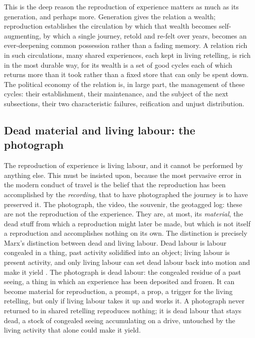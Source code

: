 This is the deep reason the reproduction of experience matters as much as its generation, and perhaps more. Generation gives the relation a wealth; reproduction establishes the circulation by which that wealth becomes self-augmenting, by which a single journey, retold and re-felt over years, becomes an ever-deepening common possession rather than a fading memory. A relation rich in such circulations, many shared experiences, each kept in living retelling, is rich in the most durable way, for its wealth is a set of good cycles each of which returns more than it took rather than a fixed store that can only be spent down. The political economy of the relation is, in large part, the management of these cycles: their establishment, their maintenance, and the subject of the next subsections, their two characteristic failures, reification and unjust distribution.

\subsection{Dead material and living labour: the photograph}
\label{p21:sub:reproduction-deadlabour}

The reproduction of experience is living labour, and it cannot be performed by anything else. This must be insisted upon, because the most pervasive error in the modern conduct of travel is the belief that the reproduction has been accomplished by the \emph{recording}, that to have photographed the journey is to have preserved it. The photograph, the video, the souvenir, the geotagged log: these are not the reproduction of the experience. They are, at most, its \emph{material}, the dead stuff from which a reproduction might later be made, but which is not itself a reproduction and accomplishes nothing on its own. The distinction is precisely Marx's distinction between dead and living labour. Dead labour is labour congealed in a thing, past activity solidified into an object; living labour is present activity, and only living labour can set dead labour back into motion and make it yield \parencite{marx1976}. The photograph is dead labour: the congealed residue of a past seeing, a thing in which an experience has been deposited and frozen. It can become material for reproduction, a prompt, a prop, a trigger for the living retelling, but only if living labour takes it up and works it. A photograph never returned to in shared retelling reproduces nothing; it is dead labour that stays dead, a stock of congealed seeing accumulating on a drive, untouched by the living activity that alone could make it yield.

